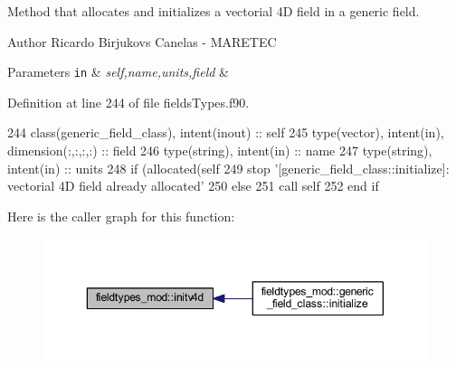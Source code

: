Method that allocates and initializes a vectorial 4D field in a generic field. 

\begin{DoxyAuthor}{Author}
Ricardo Birjukovs Canelas -\/ M\+A\+R\+E\+T\+EC 
\end{DoxyAuthor}

\begin{DoxyParams}[1]{Parameters}
\mbox{\tt in}  & {\em self,name,units,field} & \\
\hline
\end{DoxyParams}


Definition at line 244 of file fields\+Types.\+f90.


\begin{DoxyCode}
244     \textcolor{keywordtype}{class}(generic\_field\_class), \textcolor{keywordtype}{intent(inout)} :: self
245     \textcolor{keywordtype}{type}(vector), \textcolor{keywordtype}{intent(in)}, \textcolor{keywordtype}{dimension(:,:,:,:)} :: field
246     \textcolor{keywordtype}{type}(string), \textcolor{keywordtype}{intent(in)} :: name
247     \textcolor{keywordtype}{type}(string), \textcolor{keywordtype}{intent(in)} :: units
248     \textcolor{keywordflow}{if} (\textcolor{keyword}{allocated}(self%
249         stop \textcolor{stringliteral}{'[generic\_field\_class::initialize]: vectorial 4D field already allocated'}
250     \textcolor{keywordflow}{else}
251         \textcolor{keyword}{call }self%
252 \textcolor{keywordflow}{    end if}
\end{DoxyCode}
Here is the caller graph for this function\+:\nopagebreak
\begin{figure}[H]
\begin{center}
\leavevmode
\includegraphics[width=350pt]{namespacefieldtypes__mod_a08d665678bea0956a323d08863e164e5_icgraph}
\end{center}
\end{figure}
\mbox{\label{namespacefieldtypes__mod_ac3e3d9aabba3893d61583e890e3bdf41}} 
